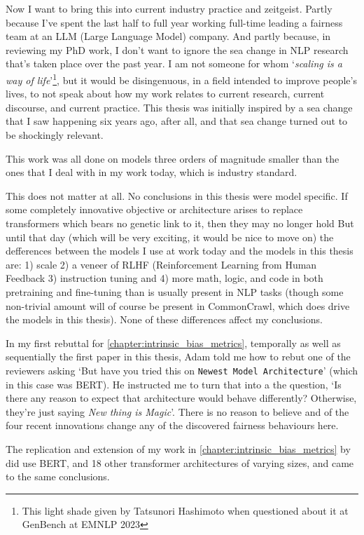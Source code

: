 Now I want to bring this into current industry practice and zeitgeist. Partly because I've spent the last half to full year working full-time leading a fairness team at an LLM (Large Language Model) company. And partly because, in reviewing my PhD work, I don't want to ignore the sea change in NLP research that's taken place over the past year. I am not someone for whom `\textit{scaling is a way of life}'\footnote{This light shade given by Tatsunori Hashimoto when questioned about it at GenBench at EMNLP 2023}, but it would be disingenuous, in a field intended to improve people's lives, to not speak about how my work relates to current research, current discourse, and current practice. This thesis was initially inspired by a sea change that I saw happening six years ago, after all, and that sea change turned out to be shockingly relevant. 

This work was all done on models three orders of magnitude smaller than the ones that I deal with in my work today, which is industry standard. 

This does not matter at all. No conclusions in this thesis were model specific. If some completely innovative objective or architecture arises to replace transformers \citep{vaswani} which bears no genetic link to it, then they may no longer hold But until that day (which will be very exciting, it would be nice to move on) the defferences between the models I use at work today and the models in this thesis are: 1) scale 2) a veneer of RLHF (Reinforcement Learning from Human Feedback \citep{} 3) instruction tuning \citep{} and 4) more math, logic, and code in both pretraining and fine-tuning than is usually present in NLP tasks (though some non-trivial amount will of course be present in CommonCrawl, which does drive the models in this thesis). None of these differences affect my conclusions. 

In my first rebuttal for \ref{chapter:intrinsic_bias_metrics}, temporally as well as sequentially the first paper in this thesis, Adam told me how to rebut one of the reviewers asking `But have you tried this on {\tt Newest Model Architecture}' (which in this case was BERT). He instructed me to turn that into a the question, `Is there any reason to expect that architecture would behave differently? Otherwise, they're just saying \textit{New thing is Magic}'. There is no reason to believe and of the four recent innovations change any of the discovered fairness behaviours here.

The replication and extension of my work in \ref{chapter:intrinsic_bias_metrics} by \citet{cao-etal-2022-intrinsic} did use BERT, and 18 other transformer architectures of varying sizes, and came to the same conclusions. 


